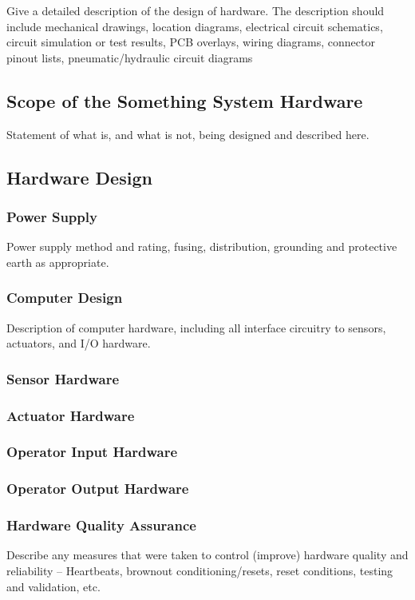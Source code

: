 \documentclass[MTRX3700report.tex]{subfiles}
\begin{document}
  Give a detailed description of the design of hardware. The description should include mechanical drawings, location diagrams, electrical circuit schematics, circuit simulation or test results, PCB overlays, wiring diagrams, connector pinout lists, pneumatic/hydraulic circuit diagrams

  \subsection{Scope of the Something System Hardware}
  Statement of what is, and what is not, being designed and described here.
  \subsection{Hardware Design}
  \subsubsection{Power Supply}
  Power supply method and rating, fusing, distribution, grounding and protective earth as appropriate.
  \subsubsection{Computer Design}
  Description of computer hardware, including all interface circuitry to sensors, actuators, and I/O hardware.
  \subsubsection{Sensor Hardware}
  \subsubsection{Actuator Hardware}
  \subsubsection{Operator Input Hardware}
  \subsubsection{Operator Output Hardware}
  \subsubsection{Hardware Quality Assurance}
  Describe any measures that were taken to control (improve) hardware quality and reliability – Heartbeats, brownout conditioning/resets, reset conditions, testing and validation, etc.
\end{document}
